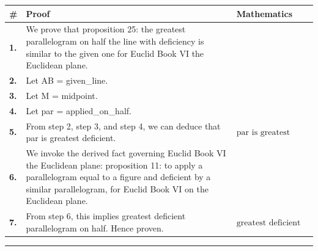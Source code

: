 \documentclass[11pt]{article}
\theoremstyle{definition}
\begin{document}
\begin{tabular}{@{} >{\raggedright\arraybackslash}p{} >{\raggedright\arraybackslash}p{} >{\raggedleft\arraybackslash}p{} @{}}
\textbf{\#} & \textbf{Proof} & \textbf{Mathematics} \\
\midrule
\textbf{1.} & We prove that proposition 25: the greatest parallelogram on half the line with deficiency is similar to the given one for Euclid Book VI the Euclidean plane. & \\[0.45em]
\textbf{2.} & Let AB = given\_line. & \\[0.45em]
\textbf{3.} & Let M = midpoint. & \\[0.45em]
\textbf{4.} & Let par = applied\_on\_half. & \\[0.45em]
\textbf{5.} & From step 2, step 3, and step 4, we can deduce that par is greatest deficient. & $\displaystyle \text{par is greatest deficient}$ \\[0.45em]
\textbf{6.} & We invoke the derived fact governing Euclid Book VI the Euclidean plane: proposition 11: to apply a parallelogram equal to a figure and deficient by a similar parallelogram, for Euclid Book VI on the Euclidean plane. & \\[0.45em]
\textbf{7.} & From step 6, this implies greatest deficient parallelogram on half. Hence proven. & $\displaystyle \text{greatest deficient parallelogram on half}$ \\[0.45em]
\bottomrule
\end{tabular}
\label{thm:Geometry-Euclid Book VI-proposition_25_the_greatest_parallelogram_on_half_the_line_with_deficiency_is_similar_to_the_given_one}
\par\medskip\hrule
\end{document}
